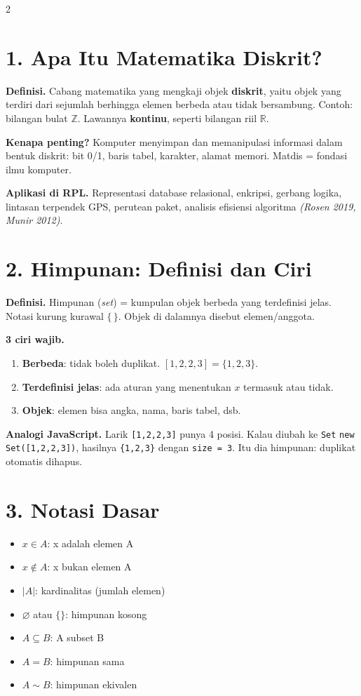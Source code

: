 \documentclass[9pt,a4paper]{extarticle}
\newcommand{\h}[1]{\textbf{#1}}
\newcommand{\src}[1]{\textit{(#1)}}
\begin{document}
\vspace{-4pt}
\begin{multicols*}{2}

	\section*{1. Apa Itu Matematika Diskrit?}

	\h{Definisi.} Cabang matematika yang mengkaji objek \textbf{diskrit}, yaitu objek yang terdiri dari sejumlah berhingga elemen berbeda atau tidak bersambung. Contoh: bilangan bulat $\mathbb{Z}$. Lawannya \textbf{kontinu}, seperti bilangan riil $\mathbb{R}$.

	\h{Kenapa penting?} Komputer menyimpan dan memanipulasi informasi dalam bentuk diskrit: bit 0/1, baris tabel, karakter, alamat memori. Matdis = fondasi ilmu komputer.

	\h{Aplikasi di RPL.} Representasi database relasional, enkripsi, gerbang logika, lintasan terpendek GPS, perutean paket, analisis efisiensi algoritma \src{Rosen 2019, Munir 2012}.

	\section*{2. Himpunan: Definisi dan Ciri}

	\h{Definisi.} Himpunan (\textit{set}) = kumpulan objek berbeda yang terdefinisi jelas. Notasi kurung kurawal $\{\,\}$. Objek di dalamnya disebut elemen/anggota.

	\h{3 ciri wajib.}
	\begin{enumerate}
		\item \h{Berbeda}: tidak boleh duplikat. $[1,2,2,3]=\{1,2,3\}$.
		\item \h{Terdefinisi jelas}: ada aturan yang menentukan $x$ termasuk atau tidak.
		\item \h{Objek}: elemen bisa angka, nama, baris tabel, dsb.
	\end{enumerate}

	\h{Analogi JavaScript.} Larik \texttt{[1,2,2,3]} punya 4 posisi. Kalau diubah ke \texttt{Set} \texttt{new Set([1,2,2,3])}, hasilnya \texttt{\{1,2,3\}} dengan \texttt{size~=~3}. Itu dia himpunan: duplikat otomatis dihapus.

	\section*{3. Notasi Dasar}

	\begin{itemize}
		\item $x\in A$: x adalah elemen A
		\item $x\notin A$: x bukan elemen A
		\item $|A|$: kardinalitas (jumlah elemen)
		\item $\varnothing$ atau $\{\}$: himpunan kosong
		\item $A\subseteq B$: A subset B
		\item $A=B$: himpunan sama
		\item $A\sim B$: himpunan ekivalen
	\end{itemize}


\end{multicols*}
\end{document}
